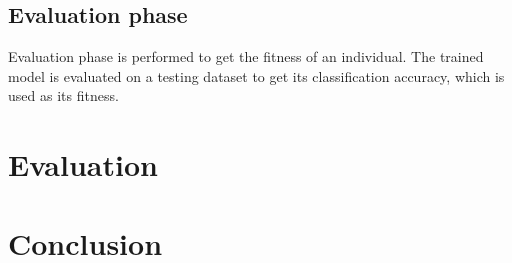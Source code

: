 \documentclass[eng]{simposium}
\begin{document}
\subsection{Evaluation phase}
Evaluation phase is performed to get the fitness of an individual.
The trained model is evaluated on a testing dataset to get its classification accuracy, which is used as its fitness.


\section{Evaluation}

\section{Conclusion}
\end{document}

